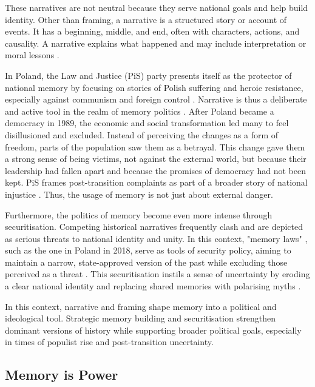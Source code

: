 These narratives are not neutral because they serve national goals and help build identity. Other than framing, a narrative is a structured story or account of events. It has a beginning, middle, and end, often with characters, actions, and causality. A narrative explains what happened and may include interpretation or moral lessons \citep{bruner_narrative_1991}.

In Poland, the Law and Justice (PiS) party presents itself as the protector of national memory by focusing on stories of Polish suffering and heroic resistance, especially against communism and foreign control \citep{malksoo_memory_2009}. Narrative is thus a deliberate and active tool in the realm of memory politics \citep{wertsch_narrative_2008}. After Poland became a democracy in 1989, the economic and social transformation led many to feel disillusioned and excluded. Instead of perceiving the changes as a form of freedom, parts of the population saw them as a betrayal. This change gave them a strong sense of being victims, not against the external world, but because their leadership had fallen apart and because the promises of democracy had not been kept. PiS frames post-transition complaints as part of a broader story of national injustice \citep{piotrowski_between_2010}. Thus, the usage of memory is not just about external danger.

Furthermore, the politics of memory become even more intense through securitisation. Competing historical narratives frequently clash and are depicted as serious threats to national identity and unity. In this context, "memory laws" \citep{malksoo_memory_2015}, such as the one in Poland in 2018, serve as tools of security policy, aiming to maintain a narrow, state-approved version of the past while excluding those perceived as a threat \citep{zuk_anti-semitic_2023}. This securitisation instils a sense of uncertainty by eroding a clear national identity and replacing shared memories with polarising myths \citep{subotic_political_2018}.

In this context, narrative and framing shape memory into a political and ideological tool. Strategic memory building and securitisation strengthen dominant versions of history while supporting broader political goals, especially in times of populist rise and post-transition uncertainty.

\subsection{Memory is Power}
\label{sec:memory_is_power}

